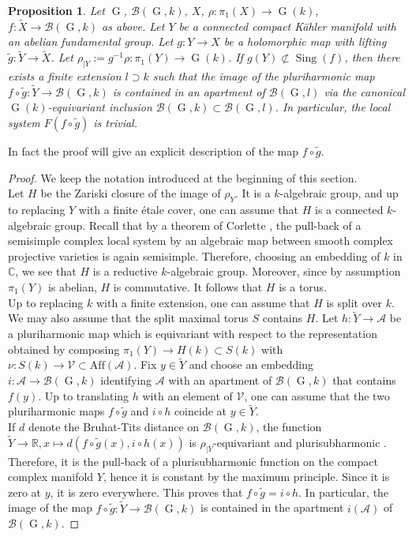 \documentclass[11pt,letterpaper]{amsart}
\def\bR{\mathbb{R}}
\def\bC{\mathbb{C}}
\def\cA{\mathcal{A}}
\def\cV{\mathcal{V}}
\theoremstyle{plain}
\newtheorem{prop}[thm]{Proposition}
\DeclareMathOperator{\rG}{G}
\DeclareMathOperator{\Sing}{Sing}
\begin{document}
\begin{prop}\label{Klocal system trivial on abelian varieties}
Let $\rG$, $\mathscr{B}(\rG, k)$, $X$, $\rho \colon \pi_1(X) \to \rG(k)$, $f \colon \tilde X \to \mathscr{B}(\rG, k)$ as above. Let $Y$ be a connected compact K\"ahler manifold with an abelian fundamental group. Let $g \colon Y \to X$ be a holomorphic map with lifting $\tilde g \colon \tilde Y \to \tilde X$. Let $\rho_{|Y} := g^{-1} \rho \colon \pi_1(Y) \to \rG(k)$. If $g(Y) \not \subset \Sing(f)$, then there exists a finite extension $l \supset k$ such that the image of the pluriharmonic map $f \circ \tilde g \colon \tilde Y \to  \mathscr{B}(\rG, k)$ is contained in an apartment of $\mathscr{B}(\rG, l)$ via the canonical $\rG(k)$-equivariant inclusion $\mathscr{B}(\rG, k) \subset \mathscr{B}(\rG, l)$. In particular, the local system $F(f \circ \tilde g)$ is trivial.   
\end{prop}

In fact the proof will give an explicit description of the map $f \circ \tilde g$.
\begin{proof}
We keep the notation introduced at the beginning of this section.\\
Let $H$ be the Zariski closure of the image of $\rho_Y$. It is a $k$-algebraic group, and up to replacing $Y$ with a finite étale cover, one can assume that $H$ is a connected $k$-algebraic group.  Recall that by a theorem of Corlette \cite{Corlette_JDG}, the pull-back of a semisimple complex local system  by an algebraic map between smooth complex projective varieties is again semisimple. Therefore, choosing an embedding of $k$ in $\bC$, we see that $H$ is a reductive $k$-algebraic group. Moreover, since by assumption $\pi_1(Y)$ is abelian, $H$ is commutative. It follows that $H$ is a torus.  \\
Up to replacing $k$ with a finite extension, one can assume that $H$ is split over $k$. We may also assume that the split maximal torus $S$ contains $H$. Let $h \colon \tilde Y \to \cA$ be a pluriharmonic map which is equivariant with respect to the representation obtained by composing $\pi_1(Y) \to H(k) \subset S(k)$ with $\nu \colon S(k) \to \cV \subset \mathrm{Aff}(\cA)$. Fix $y \in \tilde Y$ and choose an embedding $i \colon \cA \to  \mathscr{B}(\rG, k)$ identifying $\cA$ with an apartment of $\mathscr{B}(\rG, k)$ that contains $f(y)$. Up to translating $h$ with an element of $\cV$, one can assume that the two pluriharmonic maps $f \circ \tilde g$ and $i \circ h$ coincide at $y \in \tilde Y$.\\
If $d$ denote the Bruhat-Tits distance on $\mathscr{B}(\rG, k)$, the function $\tilde Y \to \bR, x \mapsto d(f \circ \tilde g(x),i \circ h(x))$ is $\rho_{|Y}$-equivariant and plurisubharmonic \cite[Lemma 5.3]{Gromov-Schoen}. Therefore, it is the pull-back of a plurisubharmonic function on the compact complex manifold $Y$, hence it is constant by the maximum principle. Since it is zero at $y$, it is zero everywhere. This proves that $f \circ \tilde g = i \circ h$. In particular, the image of the map $f \circ \tilde g \colon \tilde Y \to  \mathscr{B}(\rG, k)$ is contained in the apartment $i(\cA)$ of $\mathscr{B}(\rG, k)$. 
\end{proof}
\end{document}
